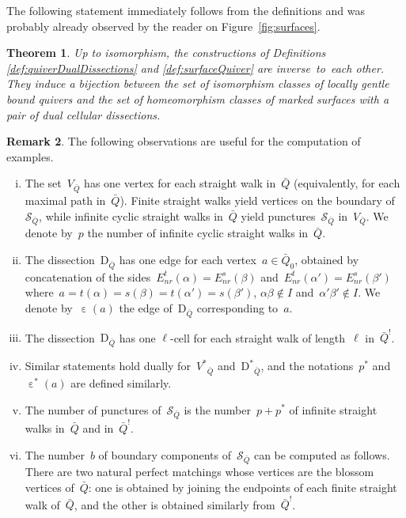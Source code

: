 \documentclass{amsart}
\newtheorem{theorem}{Theorem}[section]
\theoremstyle{definition}
\newtheorem{remark}[theorem]{Remark}
\newcommand{\fref}[1]{Figure~\ref{#1}} %
\newcommand{\Enrs}[1]{E_{nr}^{s}(#1)}
\newcommand{\Enrt}[1]{E_{nr}^{t}(#1)}
\newcommand{\surface}{\mathcal{S}} %
\newcommand{\dual}{^*} %
\newcommand{\dissection}{\mathrm{D}} %
\newcommand{\edgeof}{\operatorname{\varepsilon}} %
\newcommand{\dualedgeof}{\operatorname{\varepsilon}\dual} %
\newcommand{\koszul}{^!} %
\begin{document}
The following statement immediately follows from the definitions and was probably already observed by the reader on \fref{fig:surfaces}.

\begin{theorem}
\label{thm:bijectionLocallyGentleAndSurfaces}
Up to isomorphism, the constructions of Definitions \ref{def:quiverDualDissections} and \ref{def:surfaceQuiver} are inverse~to~each other.
They induce a bijection between the set of isomorphism classes of locally gentle bound quivers and the set of homeomorphism classes of marked surfaces with a pair of dual cellular dissections.
\end{theorem}

\begin{remark}
\label{rem:propertiesSurface}
The following observations are useful for the computation of examples.
\begin{enumerate}[(i)]
\item The set~$V_{\bar Q}$ has one vertex for each straight walk in~$\bar Q$ (equivalently, for each maximal path in~$\bar Q$).
      Finite straight walks yield vertices on the boundary of~$\surface_{\bar Q}$, while infinite cyclic straight walks in~$\bar Q$ yield punctures~$\surface_{\bar Q}$ in~$V_{\bar Q}$.
      We denote by~$p$ the number of infinite cyclic straight walks in~$\bar Q$.
\item \label{item:edges}
      The dissection~$\dissection_{\bar Q}$ has one edge for each vertex~$a \in \bar Q_0$, obtained by concatenation of the sides~$\Enrt{\alpha} = \Enrs{\beta}$ and~$\Enrt{\alpha'} = \Enrs{\beta'}$ where~$a = t(\alpha) = s(\beta) = t(\alpha') = s(\beta')$, $\alpha\beta \notin I$ and~$\alpha'\beta' \notin I$. We denote by~$\edgeof(a)$ the edge of~$\dissection_{\bar Q}$ corresponding to~$a$.
\item The dissection~$\dissection_{\bar Q}$ has one $\ell$-cell for each straight walk of length~$\ell$ in~$\bar Q\koszul$.
\item Similar statements hold dually for~${{V\dual}\!\!_{\bar Q}}$ and~${\dissection\dual\!\!_{\bar Q}}$, and the notations~$p\dual$ and~$\dualedgeof(a)$ are defined similarly.
\item The number of punctures of~$\surface_{\bar Q}$ is the number~$p + p\dual$ of infinite straight walks in~$\bar Q$ and in~$\bar Q\koszul$.
\item \label{item:boundary}
      The number~$b$ of boundary components of~$\surface_{\bar Q}$ can be computed as follows.
      There are two natural perfect matchings whose vertices are the blossom vertices of~$\bar Q$: one is obtained by joining the endpoints of each finite straight walk of~$\bar Q$, and the other is obtained similarly from~$\bar Q \koszul$.

\end{enumerate}
\end{remark}
\end{document}
